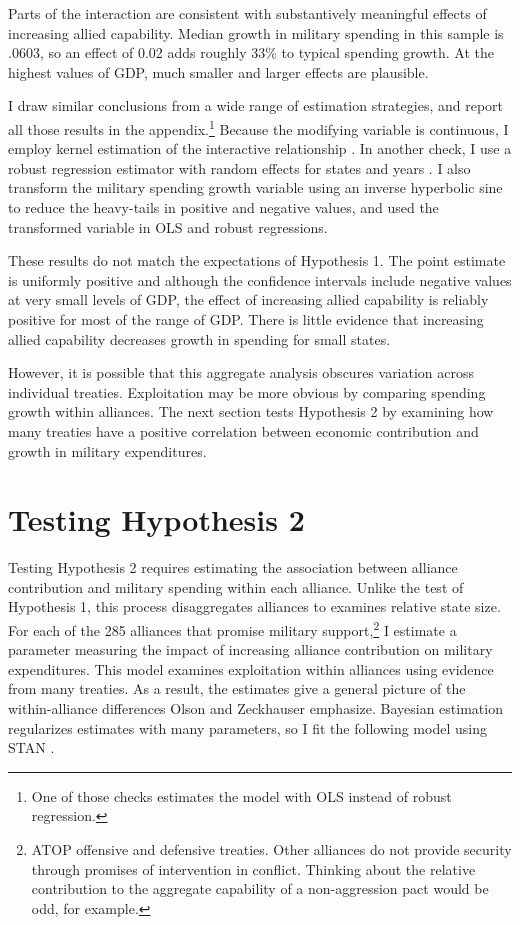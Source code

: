 \documentclass[12pt]{article}
\begin{document}
Parts of the interaction are consistent with substantively meaningful effects of increasing allied capability. 
Median growth in military spending in this sample is .0603, so an effect of 0.02 adds roughly 33\% to typical spending growth. 
At the highest values of GDP, much smaller and larger effects are plausible. 


I draw similar conclusions from a wide range of estimation strategies, and report all those results in the appendix.\footnote{One of those checks estimates the model with OLS instead of robust regression.}
Because the modifying variable is continuous, I employ kernel estimation of the interactive relationship \citep{Hainmuelleretal2019}.
In another check, I use a robust regression estimator with random effects for states and years \citep{Koller2016}. 
I also transform the military spending growth variable using an inverse hyperbolic sine to reduce the heavy-tails in positive and negative values, and used the transformed variable in OLS and robust regressions. 


These results do not match the expectations of Hypothesis 1. 
The point estimate is uniformly positive and although the confidence intervals include negative values at very small levels of GDP, the effect of increasing allied capability is reliably positive for most of the range of GDP. 
There is little evidence that increasing allied capability decreases growth in spending for small states. 


However, it is possible that this aggregate analysis obscures variation across individual treaties. 
Exploitation may be more obvious by comparing spending growth within alliances. 
The next section tests Hypothesis 2 by examining how many treaties have a positive correlation between economic contribution and growth in military expenditures. 


\section{Testing Hypothesis 2}


Testing Hypothesis 2 requires estimating the association between alliance contribution and military spending within each alliance.
Unlike the test of Hypothesis 1, this process disaggregates alliances to examines relative state size. 
For each of the 285 alliances that promise military support,\footnote{ATOP offensive and defensive treaties. Other alliances do not provide security through promises of intervention in conflict. Thinking about the relative contribution to the aggregate capability of a non-aggression pact would be odd, for example.} I estimate a parameter measuring the impact of increasing alliance contribution on military expenditures. 
This model examines exploitation within alliances using evidence from many treaties. 
As a result, the estimates give a general picture of the within-alliance differences Olson and Zeckhauser emphasize.  
Bayesian estimation regularizes estimates with many parameters, so I fit the following model using STAN \citep{Carpenteretal2016}.
\end{document}
